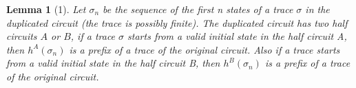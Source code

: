 \documentclass[12pt]{report}
\newtheorem*{lemma}{Lemma}
\begin{document}
\begin{lemma}[1]
Let $\sigma_n$ be the sequence of the first n states of a trace $\sigma$ in the duplicated circuit (the trace is possibly finite).  The duplicated circuit has two half circuits $A$ or $B$, if a trace $\sigma$ starts from a valid initial state in the half circuit A, then $h^{A}(\sigma_n)$ is a prefix of a trace of the original circuit.  Also if a trace starts from a valid initial state in the half circuit B, then $h^{B}(\sigma_n)$ is a prefix of a trace of the original circuit.


\end{lemma}
\end{document}
